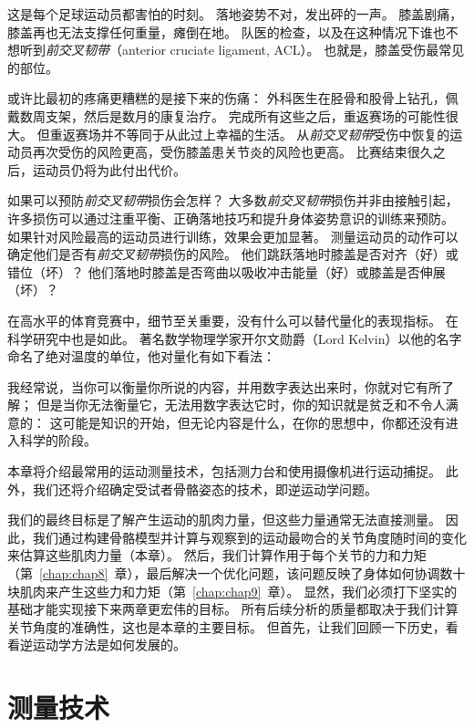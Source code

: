 这是每个足球运动员都害怕的时刻。
落地姿势不对，发出砰的一声。
膝盖剧痛，膝盖再也无法支撑任何重量，瘫倒在地。
队医的检查，以及在这种情况下谁也不想听到\textit{前交叉韧带}（anterior cruciate ligament, ACL）。
也就是，膝盖受伤最常见的部位。


或许比最初的疼痛更糟糕的是接下来的伤痛：
外科医生在胫骨和股骨上钻孔，佩戴数周支架，然后是数月的康复治疗。
完成所有这些之后，重返赛场的可能性很大。
但重返赛场并不等同于从此过上幸福的生活。
从\textit{前交叉韧带}受伤中恢复的运动员再次受伤的风险更高，受伤膝盖患关节炎的风险也更高。
比赛结束很久之后，运动员仍将为此付出代价。


如果可以预防\textit{前交叉韧带}损伤会怎样？
大多数\textit{前交叉韧带}损伤并非由接触引起，许多损伤可以通过注重平衡、正确落地技巧和提升身体姿势意识的训练来预防。
如果针对风险最高的运动员进行训练，效果会更加显著。
测量运动员的动作可以确定他们是否有\textit{前交叉韧带}损伤的风险。
他们跳跃落地时膝盖是否对齐（好）或错位（坏）？
他们落地时膝盖是否弯曲以吸收冲击能量（好）或膝盖是否伸展（坏）？


在高水平的体育竞赛中，细节至关重要，没有什么可以替代量化的表现指标。
在科学研究中也是如此。
著名数学物理学家开尔文勋爵（Lord Kelvin）以他的名字命名了绝对温度的单位，他对量化有如下看法\cite{thomson1894popular}：



我经常说，当你可以衡量你所说的内容，并用数字表达出来时，你就对它有所了解；
但是当你无法衡量它，无法用数字表达它时，你的知识就是贫乏和不令人满意的：
这可能是知识的开始，但无论内容是什么，在你的思想中，你都还没有进入科学的阶段。


本章将介绍最常用的运动测量技术，包括测力台和使用摄像机进行运动捕捉。
此外，我们还将介绍确定受试者骨骼姿态的技术，即逆运动学问题。


我们的最终目标是了解产生运动的肌肉力量，但这些力量通常无法直接测量。
因此，我们通过构建骨骼模型并计算与观察到的运动最吻合的关节角度随时间的变化来估算这些肌肉力量（本章）。
然后，我们计算作用于每个关节的力和力矩（第~\ref{chap:chap8}~章），最后解决一个优化问题，该问题反映了身体如何协调数十块肌肉来产生这些力和力矩（第~\ref{chap:chap9}~章）。
显然，我们必须打下坚实的基础才能实现接下来两章更宏伟的目标。
所有后续分析的质量都取决于我们计算关节角度的准确性，这也是本章的主要目标。
但首先，让我们回顾一下历史，看看逆运动学方法是如何发展的。



\section{测量技术}

